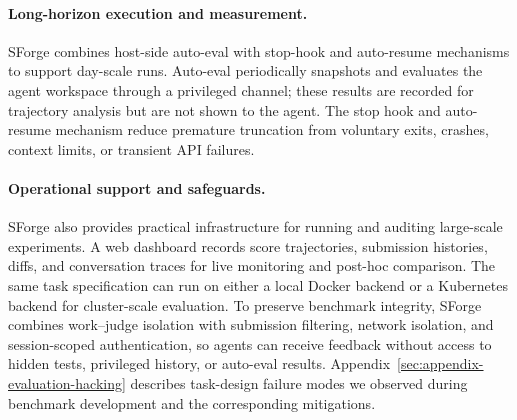 \paragraph{Long-horizon execution and measurement.}
SForge combines host-side auto-eval with stop-hook and auto-resume mechanisms to support day-scale runs. Auto-eval periodically snapshots and evaluates the agent workspace through a privileged channel; these results are recorded for trajectory analysis but are not shown to the agent. The stop hook and auto-resume mechanism reduce premature truncation from voluntary exits, crashes, context limits, or transient API failures.

\paragraph{Operational support and safeguards.}
SForge also provides practical infrastructure for running and auditing large-scale experiments. A web dashboard records score trajectories, submission histories, diffs, and conversation traces for live monitoring and post-hoc comparison. The same task specification can run on either a local Docker backend or a Kubernetes backend for cluster-scale evaluation. To preserve benchmark integrity, SForge combines work--judge isolation with submission filtering, network isolation, and session-scoped authentication, so agents can receive feedback without access to hidden tests, privileged history, or auto-eval results. Appendix~\ref{sec:appendix-evaluation-hacking} describes task-design failure modes we observed during benchmark development and the corresponding mitigations.
